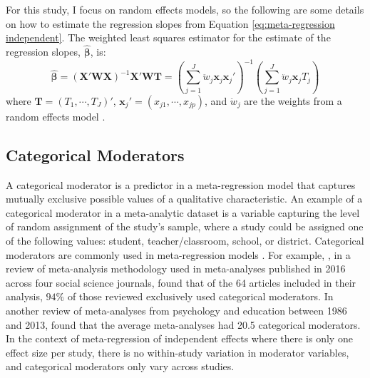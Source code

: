 For this study, I focus on random effects models, so the following are some details on how to estimate the regression slopes from Equation \ref{eq:meta-regression independent}. The weighted least squares estimator for the estimate of the regression slopes, $\bm{\hat{\beta}}$, is:
\begin{equation}\label{eq:estbetaind}
    \bm{\hat{\beta}} = (\mathbf{X}'\mathbf{W}\mathbf{X})^{-1}\mathbf{X}'\mathbf{W}\mathbf{T} = \left( \sum_{j=1}^J \ddot{w}_j\mathbf{x}_j\mathbf{x}_j' \right)^{-1}\left( \sum_{j=1}^J \ddot{w}_j\mathbf{x}_j T_j \right)
\end{equation}
where $\mathbf{T} = (T_1, \cdots, T_J)'$, $\mathbf{x}_j' = (x_{j1}, \cdots, x_{jp})$, and $\ddot{w}_j$ are the weights from a random effects model \autocite{cooper2019}. 

\subsection{Categorical Moderators} 
 A categorical moderator is a predictor in a meta-regression model that captures mutually exclusive possible values of a qualitative characteristic. An example of a categorical moderator in a meta-analytic dataset is a variable capturing the level of random assignment of the study's sample, where a study could be assigned one of the following values: student, teacher/classroom, school, or district. Categorical moderators are commonly used in meta-regression models  \autocite{tipton2019, ahn2012}. For example, \textcite{tipton2019}, in a review of meta-analysis methodology used in meta-analyses published in 2016 across four social science journals, found that of the 64 articles included in their analysis, $94\%$ of those reviewed exclusively used categorical moderators. In another review of meta-analyses from psychology and education between 1986 and 2013, \textcite{polanin2016} found that the average meta-analyses had 20.5 categorical moderators. In the context of meta-regression of independent effects where there is only one effect size per study, there is no within-study variation in moderator variables, and categorical moderators only vary across studies. 
 

